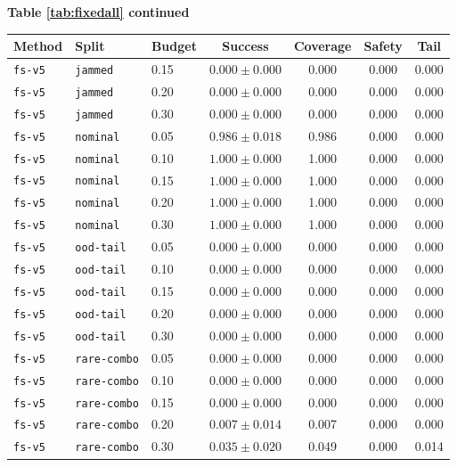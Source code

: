 \documentclass{article}
\begin{document}
\begin{center}
\textbf{Table \ref{tab:fixedall} continued}\\[0.4ex]
\begin{tabular}{lllcccc}
\toprule
Method & Split & Budget & Success & Coverage & Safety & Tail \\
\midrule
\texttt{fs-v5} & \texttt{jammed} & 0.15 & $0.000 \pm 0.000$ & 0.000 & 0.000 & 0.000 \\
\texttt{fs-v5} & \texttt{jammed} & 0.20 & $0.000 \pm 0.000$ & 0.000 & 0.000 & 0.000 \\
\texttt{fs-v5} & \texttt{jammed} & 0.30 & $0.000 \pm 0.000$ & 0.000 & 0.000 & 0.000 \\
\texttt{fs-v5} & \texttt{nominal} & 0.05 & $0.986 \pm 0.018$ & 0.986 & 0.000 & 0.000 \\
\texttt{fs-v5} & \texttt{nominal} & 0.10 & $1.000 \pm 0.000$ & 1.000 & 0.000 & 0.000 \\
\texttt{fs-v5} & \texttt{nominal} & 0.15 & $1.000 \pm 0.000$ & 1.000 & 0.000 & 0.000 \\
\texttt{fs-v5} & \texttt{nominal} & 0.20 & $1.000 \pm 0.000$ & 1.000 & 0.000 & 0.000 \\
\texttt{fs-v5} & \texttt{nominal} & 0.30 & $1.000 \pm 0.000$ & 1.000 & 0.000 & 0.000 \\
\texttt{fs-v5} & \texttt{ood-tail} & 0.05 & $0.000 \pm 0.000$ & 0.000 & 0.000 & 0.000 \\
\texttt{fs-v5} & \texttt{ood-tail} & 0.10 & $0.000 \pm 0.000$ & 0.000 & 0.000 & 0.000 \\
\texttt{fs-v5} & \texttt{ood-tail} & 0.15 & $0.000 \pm 0.000$ & 0.000 & 0.000 & 0.000 \\
\texttt{fs-v5} & \texttt{ood-tail} & 0.20 & $0.000 \pm 0.000$ & 0.000 & 0.000 & 0.000 \\
\texttt{fs-v5} & \texttt{ood-tail} & 0.30 & $0.000 \pm 0.000$ & 0.000 & 0.000 & 0.000 \\
\texttt{fs-v5} & \texttt{rare-combo} & 0.05 & $0.000 \pm 0.000$ & 0.000 & 0.000 & 0.000 \\
\texttt{fs-v5} & \texttt{rare-combo} & 0.10 & $0.000 \pm 0.000$ & 0.000 & 0.000 & 0.000 \\
\texttt{fs-v5} & \texttt{rare-combo} & 0.15 & $0.000 \pm 0.000$ & 0.000 & 0.000 & 0.000 \\
\texttt{fs-v5} & \texttt{rare-combo} & 0.20 & $0.007 \pm 0.014$ & 0.007 & 0.000 & 0.000 \\
\texttt{fs-v5} & \texttt{rare-combo} & 0.30 & $0.035 \pm 0.020$ & 0.049 & 0.000 & 0.014 \\

\end{tabular}
\end{center}
\end{document}
